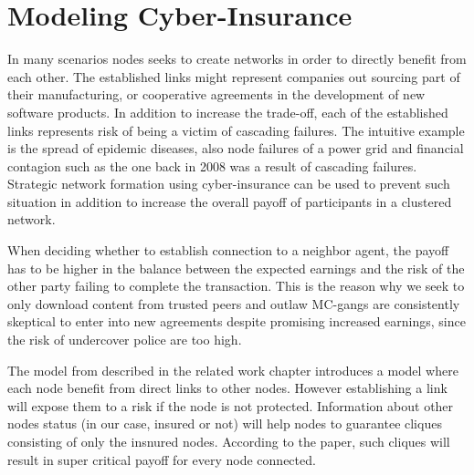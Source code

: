 \chapter{Modeling Cyber-Insurance }
\label{chp:modelingCyberInsurance} 

In many scenarios nodes seeks to create networks in order to directly benefit from each other. The established links might represent companies out sourcing part of their manufacturing, or cooperative agreements in the development of new software products. In addition to increase the trade-off, each of the established links represents risk of being a victim of cascading failures. The intuitive example is the spread of epidemic diseases, also node failures of a power grid and financial contagion such as the one back in 2008 was a result of cascading failures. Strategic network formation using cyber-insurance can be used to prevent such situation in addition to increase the overall payoff of participants in a clustered network.

When deciding whether to establish connection to a neighbor agent, the payoff has to be higher in the balance between the expected earnings and the risk of the other party failing to complete the transaction. This is the reason why we seek to only download content from trusted peers and outlaw MC-gangs are consistently skeptical to enter into new agreements despite promising increased earnings, since the risk of undercover police are too high. 

The model from \cite{contagion} described in the related work chapter introduces a model where each node benefit from direct links to other nodes. However establishing a link will expose them to a risk if the node is not protected. Information about other nodes status (in our case, insured or not) will help nodes to guarantee cliques consisting of only the insnured nodes. According to the paper, such cliques will result in super critical payoff for every node connected. 

